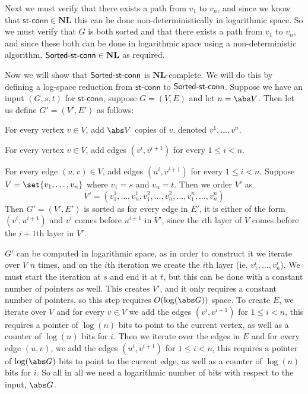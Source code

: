 \documentclass[10pt]{article}
\def\stconn{\textsf{st-conn}}
\def\NL{\mathbf{NL}}
\begin{document}
Next we must verify that there exists a path from $v_1$ to $v_n$, and since we know that $\stconn\in\NL$ this can be done non-deterministically in logarithmic space.
So we must verify that $G$ is both sorted and that there exists a path from $v_1$ to $v_n$, and since these both can be done in logarithmic space using a non-deterministic algorithm, $\sortstconn\in\NL$
as required.

Now we will show that $\textsf{Sorted-st-conn}$ is $\NL$-complete.
We will do this by defining a log-space reduction from $\stconn$ to $\textsf{Sorted-st-conn}$.
Suppose we have an input $(G,s,t)$ for $\stconn$, suppose $G=(V,E)$ and let $n=\abs V$.
Then let us define $G'=(V',E')$ as follows:
\benum
    \item For every vertex $v\in V$, add $\abs V$ copies of $v$, denoted $v^1,\dots,v^n$.
    \item For every vertex $v\in V$, add edges $(v^i,v^{i+1})$ for every $1\leq i<n$.
    \item For every edge $(u,v)\in V$, add edges $(u^i,v^{i+1})$ for every $1\leq i<n$.
\eenum
Suppose $V=\set{v_1,\dots,v_n}$ where $v_1=s$ and $v_n=t$.
Then we order $V'$ as
\[ V' = (v^1_1,\dots,v^1_n,v^2_1,\dots,v^2_n,\dots,v^n_1,\dots,v^n_n) \]
Then $G'=(V',E')$ is sorted as for every edge in $E'$, it is either of the form $(v^i,u^{i+1})$ and $v^i$ comes before $u^{i+1}$ in $V'$, since the $i$th layer of $V$ comes before the $i+1$th layer in $V'$.

$G'$ can be computed in logarithmic space, as in order to construct it we iterate over $V$ $n$ times, and on the $i$th iteration we create the $i$th layer (ie. $v^i_1,\dots,v^i_n$).
We must start the iteration at $s$ and end it at $t$, but this can be done with a constant number of pointers as well.
This creates $V'$, and it only requires a constant number of pointers, so this step requires $O(\log(\abs G))$ space.
To create $E$, we iterate over $V$ and for every $v\in V$ we add the edges $(v^i,v^{i+1})$ for $1\leq i<n$, this requires a pointer of $\log(n)$ bits to point to the current vertex, as well as a counter of
$\log(n)$ bits for $i$.
Then we iterate over the edges in $E$ and for every edge $(u,v)$, we add the edges $(u^i,v^{i+1})$ for $1\leq i<n$, this requires a pointer of $\log(\abs G)$ bits to point to the current edge, as well as a
counter of $\log(n)$ bits for $i$.
So all in all we need a logarithmic number of bits with respect to the input, $\abs G$.
\end{document}

